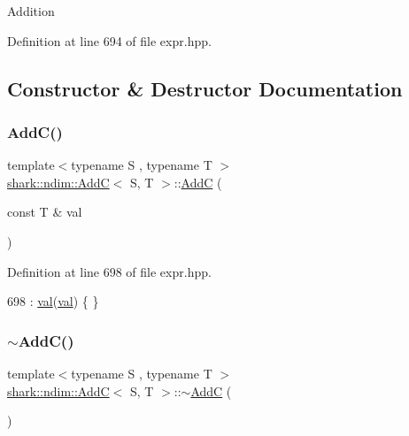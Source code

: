 Addition 

Definition at line 694 of file expr.\+hpp.



\subsection{Constructor \& Destructor Documentation}
\hypertarget{classshark_1_1ndim_1_1_add_c_a5044afde60f2b80178594c82e2bcc107}{}\label{classshark_1_1ndim_1_1_add_c_a5044afde60f2b80178594c82e2bcc107} 
\subsubsection{\texorpdfstring{Add\+C()}{AddC()}}
{\footnotesize\ttfamily template$<$typename S , typename T $>$ \\
\hyperlink{classshark_1_1ndim_1_1_add_c}{shark\+::ndim\+::\+AddC}$<$ S, T $>$\+::\hyperlink{classshark_1_1ndim_1_1_add_c}{AddC} (\begin{DoxyParamCaption}\item[{const T \&}]{val }\end{DoxyParamCaption})\hspace{0.3cm}{\ttfamily [inline]}}



Definition at line 698 of file expr.\+hpp.


\begin{DoxyCode}
698 : \hyperlink{classshark_1_1ndim_1_1_add_c_a30bcb1ec409e0b53c65adec49eb2af81}{val}(\hyperlink{classshark_1_1ndim_1_1_add_c_a30bcb1ec409e0b53c65adec49eb2af81}{val}) \{ \}
\end{DoxyCode}
\hypertarget{classshark_1_1ndim_1_1_add_c_acab0d95354a5bb1835f9e68e60899749}{}\label{classshark_1_1ndim_1_1_add_c_acab0d95354a5bb1835f9e68e60899749} 
\subsubsection{\texorpdfstring{$\sim$\+Add\+C()}{~AddC()}}
{\footnotesize\ttfamily template$<$typename S , typename T $>$ \\
\hyperlink{classshark_1_1ndim_1_1_add_c}{shark\+::ndim\+::\+AddC}$<$ S, T $>$\+::$\sim$\hyperlink{classshark_1_1ndim_1_1_add_c}{AddC} (\begin{DoxyParamCaption}{ }\end{DoxyParamCaption})\hspace{0.3cm}{\ttfamily [inline]}}



